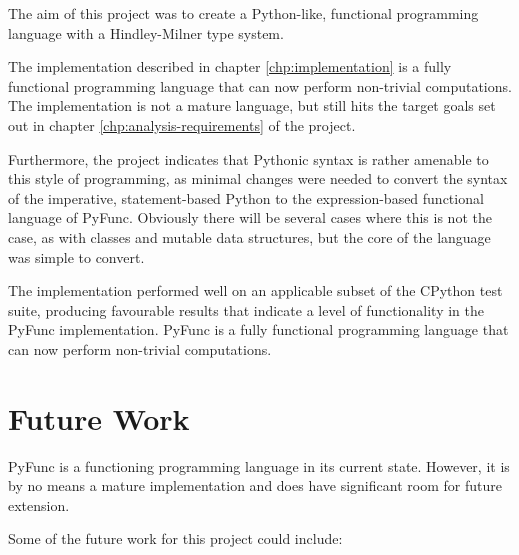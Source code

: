\documentclass{l4proj}
\begin{document}

The aim of this project was to create a Python-like, functional programming language with a Hindley-Milner type system.

The implementation described in chapter \ref{chp:implementation} is a fully functional programming language that can now perform non-trivial computations.
The implementation is not a mature language, but still hits the target goals set out in chapter \ref{chp:analysis-requirements} of the project.

Furthermore, the project indicates that Pythonic syntax is rather amenable to this style of programming, as minimal changes were needed to convert the syntax of the imperative, statement-based Python to the expression-based functional language of PyFunc.
Obviously there will be several cases where this is not the case, as with classes and mutable data structures, but the core of the language was simple to convert.

The implementation performed well on an applicable subset of the CPython test suite, producing favourable results that indicate a level of functionality in the PyFunc implementation.
PyFunc is a fully functional programming language that can now perform non-trivial computations.

\section{Future Work}

PyFunc is a functioning programming language in its current state.
However, it is by no means a mature implementation and does have significant room for future extension.

Some of the future work for this project could include:
\end{document}

